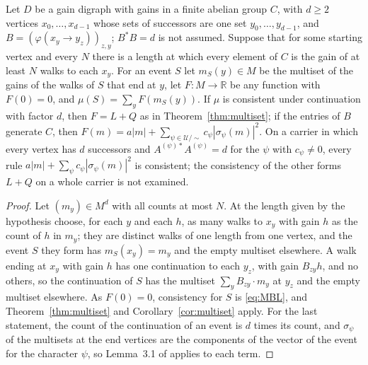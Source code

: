 \begin{corollary}\label{cor:multicar}
Let $D$ be a gain digraph with gains in a finite abelian group $C$, with $d\ge2$ vertices $x_0,\dots,x_{d-1}$ whose sets of successors are one set $y_0,\dots,y_{d-1}$, and $B=(\varphi(x_y\to y_z))_{z,y}$; $B^*B=d$ is not assumed. Suppose that for some starting vertex and every $N$ there is a length at which every element of $C$ is the gain of at least $N$ walks to each $x_y$. For an event $S$ let $m_S(y)\in M$ be the multiset of the gains of the walks of $S$ that end at $y$, let $F\colon M\to\mathbb{R}$ be any function with $F(0)=0$, and $\mu(S)=\sum_yF(m_S(y))$. If $\mu$ is consistent under continuation with factor $d$, then $F=L+Q$ as in Theorem~\ref{thm:multiset}; if the entries of $B$ generate $C$, then $F(m)=a|m|+\sum_{\psi\in \mathcal{U}/\sim}c_\psi|\sigma_\psi(m)|^2$. On a carrier in which every vertex has $d$ successors and $A^{(\psi)*}A^{(\psi)}=d$ for the $\psi$ with $c_\psi\ne0$, every rule $a|m|+\sum_\psi c_\psi|\sigma_\psi(m)|^2$ is consistent; the consistency of the other forms $L+Q$ on a whole carrier is not examined.
\end{corollary}
\begin{proof}
Let $(m_y)\in M^d$ with all counts at most $N$. At the length given by the hypothesis choose, for each $y$ and each $h$, as many walks to $x_y$ with gain $h$ as the count of $h$ in $m_y$; they are distinct walks of one length from one vertex, and the event $S$ they form has $m_S(x_y)=m_y$ and the empty multiset elsewhere. A walk ending at $x_y$ with gain $h$ has one continuation to each $y_z$, with gain $B_{zy}h$, and no others, so the continuation of $S$ has the multiset $\sum_yB_{zy}\cdot m_y$ at $y_z$ and the empty multiset elsewhere. As $F(0)=0$, consistency for $S$ is \eqref{eq:MBL}, and Theorem~\ref{thm:multiset} and Corollary~\ref{cor:multiset} apply. For the last statement, the count of the continuation of an event is $d$ times its count, and $\sigma_\psi$ of the multisets at the end vertices are the components of the vector of the event for the character $\psi$, so Lemma~3.1 of \cite{g9} applies to each term.
\end{proof}

